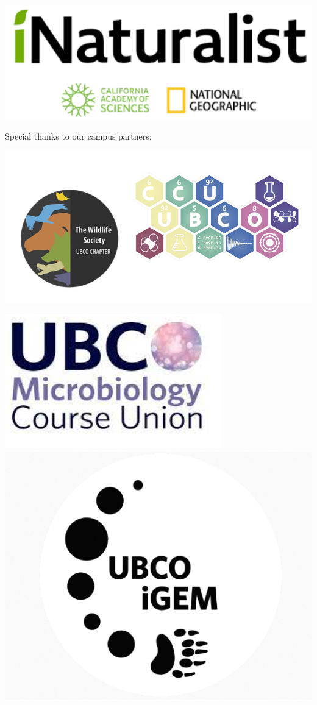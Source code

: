 \documentclass[
]{book}
\begin{document}
\begin{center}\includegraphics[width=0.99\linewidth,height=0.2\textheight]{partner_images/inat} \end{center}

Special thanks to our campus partners:

\begin{center}\includegraphics[width=0.99\linewidth,height=0.2\textheight]{partner_images/wild-ccu} \end{center}

\begin{center}\includegraphics[width=0.49\linewidth,height=0.2\textheight]{partner_images/micbio} \includegraphics[width=0.49\linewidth,height=0.2\textheight]{partner_images/igem} \end{center}

  
\end{document}
